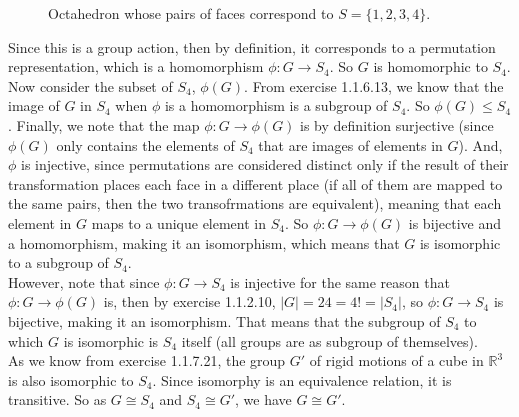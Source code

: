 \documentclass{article}
\newcommand{\R}{\mathbb{R}}
\begin{document}
\begin{figure}[H]

        \caption{\label{fig:figure1} Octahedron whose pairs of faces
        correspond to $S = \{ 1, 2, 3, 4 \}$.}
    \end{figure}
    
    Since this is a group action, then by definition,
    it corresponds to a permutation representation,
    which is a homomorphism $\phi: G \to S_4$.
    So $G$ is homomorphic to $S_4$. \\
    Now consider the subset of $S_4$, $\phi(G)$.
    From exercise 1.1.6.13, we know that the image of $G$ in $S_4$
    when $\phi$ is a homomorphism is a subgroup of $S_4$.
    So $\phi(G) \leqslant S_4$.
    Finally, we note that the map $\phi: G \to \phi(G)$
    is by definition surjective
    (since $\phi(G)$ only contains the elements of $S_4$ that are images
    of elements in $G$).
    And, $\phi$ is injective, since permutations are considered 
    distinct only if the result of their transformation places each
    face in a different place (if all of them are mapped to the same
    pairs, then the two transofrmations are equivalent),
    meaning that each element in $G$ maps to a unique element in $S_4$.
    So $\phi: G \to \phi(G)$ is bijective and a homomorphism,
    making it an isomorphism,
    which means that $G$ is isomorphic to a subgroup of $S_4$. \\
    However, note that since $\phi: G \to S_4$ is injective for the same
    reason that $\phi: G \to \phi(G)$ is,
    then by exercise 1.1.2.10, $|G| = 24 = 4! = |S_4|$,
    so $\phi: G \to S_4$ is bijective, making it an isomorphism.
    That means that the subgroup of $S_4$ to which $G$ is isomorphic
    is $S_4$ itself (all groups are as subgroup of themselves). \\
    As we know from exercise 1.1.7.21,
    the group $G'$ of rigid motions of a cube in $\R^3$
    is also isomorphic to $S_4$.
    Since isomorphy is an equivalence relation, it is transitive.
    So as $G \cong S_4$ and $S_4 \cong G'$, we have $G \cong G'$.
\end{document}
